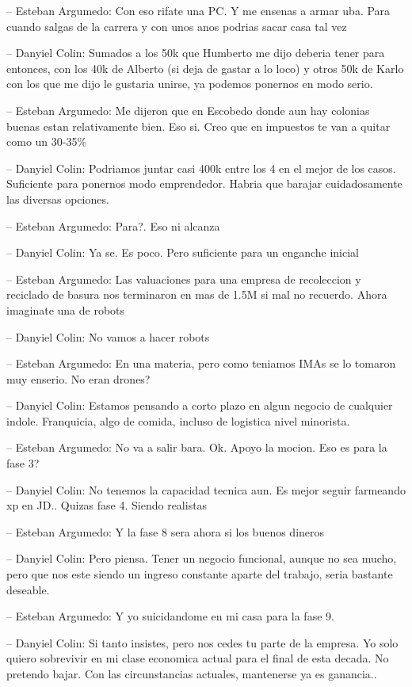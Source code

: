 -- Esteban Argumedo: Con eso rifate una PC. Y me ensenas a armar uba.
Para cuando salgas de la carrera y con unos anos podrias sacar casa tal
vez

-- Danyiel Colin: Sumados a los 50k que Humberto me dijo deberia tener
para entonces, con los 40k de Alberto (si deja de gastar a lo loco) y
otros 50k de Karlo con los que me dijo le gustaria unirse, ya podemos
ponernos en modo serio.

-- Esteban Argumedo: Me dijeron que en Escobedo donde aun hay colonias
buenas estan relativamente bien. Eso si. Creo que en impuestos te van a
quitar como un 30-35\%

-- Danyiel Colin: Podriamos juntar casi 400k entre los 4 en el mejor de
los casos. Suficiente para ponernos modo emprendedor. Habria que barajar
cuidadosamente las diversas opciones.

-- Esteban Argumedo: Para?. Eso ni alcanza

-- Danyiel Colin: Ya se. Es poco. Pero suficiente para un enganche
inicial

-- Esteban Argumedo: Las valuaciones para una empresa de recoleccion y
reciclado de basura nos terminaron en mas de 1.5M si mal no recuerdo.
Ahora imaginate una de robots

-- Danyiel Colin: No vamos a hacer robots

-- Esteban Argumedo: En una materia, pero como teniamos IMAs se lo
tomaron muy enserio. No eran drones?

-- Danyiel Colin: Estamos pensando a corto plazo en algun negocio de
cualquier indole. Franquicia, algo de comida, incluso de logistica nivel
minorista.

-- Esteban Argumedo: No va a salir bara. Ok. Apoyo la mocion. Eso es
para la fase 3?

-- Danyiel Colin: No tenemos la capacidad tecnica aun. Es mejor seguir
farmeando xp en JD.. Quizas fase 4. Siendo realistas

-- Esteban Argumedo: Y la fase 8 sera ahora si los buenos dineros

-- Danyiel Colin: Pero piensa. Tener un negocio funcional, aunque no sea
mucho, pero que nos este siendo un ingreso constante aparte del trabajo,
seria bastante deseable.

-- Esteban Argumedo: Y yo suicidandome en mi casa para la fase 9.

-- Danyiel Colin: Si tanto insistes, pero nos cedes tu parte de la
empresa. Yo solo quiero sobrevivir en mi clase economica actual para el
final de esta decada. No pretendo bajar. Con las circunstancias
actuales, mantenerse ya es ganancia..

